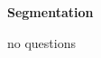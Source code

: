 
\centerline{\textbf{ \LARGE Segmentation}}



\begin{questyle}
  \question  no questions
\end{questyle}








